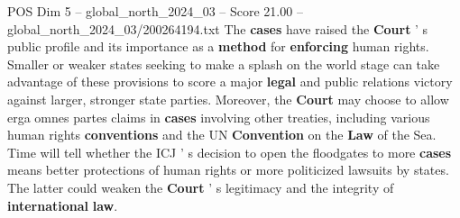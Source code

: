 \begin{textsample}{POS Dim 5 – global\_north\_2024\_03 – Score 21.00 – global\_north\_2024\_03/200264194.txt}
The \textbf{cases} have raised the \textbf{Court} ' s public profile and its importance as a \textbf{method} for \textbf{enforcing} human rights.
Smaller or weaker states seeking to make a splash on the world stage can take advantage of these provisions to score a major \textbf{legal} and public relations victory against larger, stronger state parties.
Moreover, the \textbf{Court} may choose to allow erga omnes partes claims in \textbf{cases} involving other treaties, including various human rights \textbf{conventions} and the UN \textbf{Convention} on the \textbf{Law} of the Sea.
Time will tell whether the ICJ ' s decision to open the floodgates to more \textbf{cases} means better protections of human rights or more politicized lawsuits by states.
The latter could weaken the \textbf{Court} ' s legitimacy and the integrity of \textbf{international} \textbf{law}.

\end{textsample}
